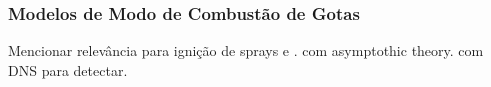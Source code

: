  



\subsubsection{Modelos de Modo de Combustão de Gotas}

Mencionar relevância para ignição de sprays e \cite{AggarwalS2014}.
 com asymptothic theory.
 com DNS para detectar.